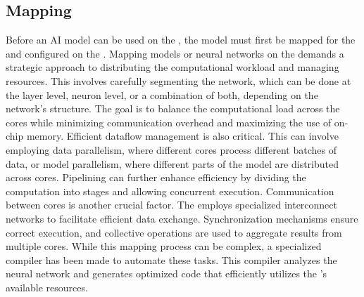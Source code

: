\subsection{Mapping}
Before an AI model can be used on the \graicore{}, the model must first be mapped for the \graicore{} and configured on the \graicore{}.
Mapping models or neural networks on the \graicore{} demands a strategic approach to distributing the computational workload and managing resources.
This involves carefully segmenting the network, which can be done at the layer level, neuron level, or a combination of both, depending on the network's structure. 
The goal is to balance the computational load across the cores while minimizing communication overhead and maximizing the use of on-chip memory.
Efficient dataflow management is also critical.
This can involve employing data parallelism, where different cores process different batches of data, or model parallelism, where different parts of the model are distributed across cores.
Pipelining can further enhance efficiency by dividing the computation into stages and allowing concurrent execution.
Communication between cores is another crucial factor.
The \graicore{} employs specialized interconnect networks to facilitate efficient data exchange.
Synchronization mechanisms ensure correct execution, and collective operations are used to aggregate results from multiple cores.
While this mapping process can be complex, a specialized compiler has been made to automate these tasks.
This compiler analyzes the neural network and generates optimized code that efficiently utilizes the \graicore{}'s available resources.

